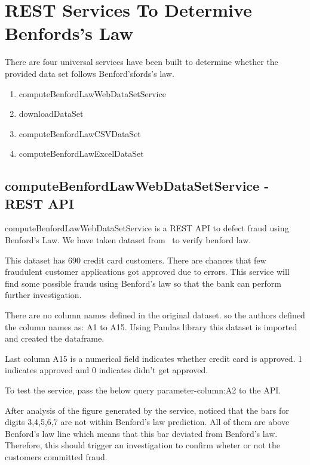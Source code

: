 \section{REST Services To Determive Benfords's Law}

There are four universal services have been built to determine
whether the provided data set follows Benford’sfords's law.

\begin{enumerate}
 \item computeBenfordLawWebDataSetService
 \item downloadDataSet
 \item computeBenfordLawCSVDataSet
 \item computeBenfordLawExcelDataSet
\end{enumerate}

\subsection{computeBenfordLawWebDataSetService - REST API}
computeBenfordLawWebDataSetService is 
a REST API to defect fraud using Benford's Law.
We have taken dataset from~\cite{hid-sp18-514-aust-cc-benford}
to verify benford law.

This dataset has 690 credit card customers.
There are chances that few fraudulent customer 
applications got approved due to errors. 
This service will find some possible frauds using 
Benford's law so that the bank can perform
further investigation.

There are no column names defined in the original dataset.
so the authors defined the column names as:
A1 to A15. Using Pandas library this dataset
is imported and created the dataframe.

Last column A15 is a numerical field 
indicates whether credit card is approved. 
1 indicates approved and 0 indicates didn't 
get approved.

To test the service, pass the below query
parameter-column:A2 to the API.


After analysis of the figure generated 
by the service, noticed that the bars 
for digits 3,4,5,6,7 are not within 
Benford's law prediction. 
All of them are above Benford's law 
line which means that this bar deviated 
from Benford's law. 
Therefore, this should trigger an investigation 
to confirm wheter or not the customers committed fraud. 

